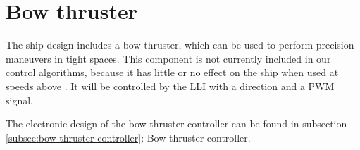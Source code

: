 \section{Bow thruster}
The ship design includes a bow thruster, which can be used to perform precision maneuvers in tight spaces. This component is not currently included in our control algorithms, because it has little or no effect on the ship when used at speeds above . It will be controlled by the \ac{LLI} with a direction and a \ac{PWM} signal. 

The electronic design of the bow thruster controller can be found in subsection \ref{subsec:bow thruster controller}: Bow thruster controller.
